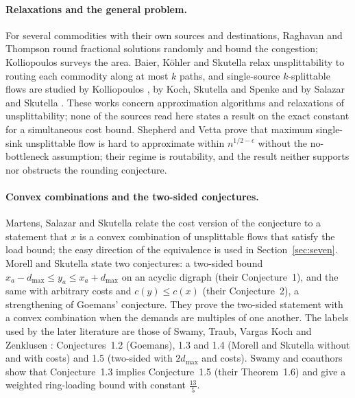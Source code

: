 \documentclass[11pt]{article}
\theoremstyle{remark}
\newcommand{\dmax}{d_{\max}}
\begin{document}
\paragraph{Relaxations and the general problem.} For several commodities with their own sources and
destinations, Raghavan and Thompson \cite{RT87,Rag88} round fractional solutions randomly and bound the
congestion; Kolliopoulos \cite{Kol07} surveys the area. Baier, K\"ohler and Skutella \cite{BKS05} relax
unsplittability to routing each commodity along at most $k$ paths, and single-source $k$-splittable flows are
studied by Kolliopoulos \cite{Kol05}, by Koch, Skutella and Spenke \cite{KSS08} and by Salazar and Skutella
\cite{SS09}. These works concern approximation algorithms and relaxations of unsplittability; none of the sources read here
states a result on the exact constant for a simultaneous cost bound. Shepherd and Vetta
\cite{SV15} prove that maximum single-sink unsplittable flow is hard to approximate within $n^{1/2-\epsilon}$
without the no-bottleneck assumption; their regime is routability, and the result neither supports nor
obstructs the rounding conjecture.

\paragraph{Convex combinations and the two-sided conjectures.} Martens, Salazar and Skutella \cite{MSS07} relate
the cost version of the conjecture to a statement that $x$ is a convex combination of unsplittable flows that
satisfy the load bound; the easy direction of the equivalence is used in Section~\ref{sec:seven}. Morell and
Skutella \cite{MS22} state two conjectures: a two-sided bound $x_a-\dmax\le y_a\le x_a+\dmax$ on an acyclic
digraph (their Conjecture~1), and the same with arbitrary costs and $c(y)\le c(x)$ (their Conjecture~2), a
strengthening of Goemans' conjecture. They prove the two-sided statement with a convex combination when the demands
are multiples of one another. The labels used by the later literature are those of Swamy, Traub, Vargas Koch and
Zenklusen \cite{STVZ25}: Conjectures~1.2 (Goemans), 1.3 and 1.4 (Morell and Skutella without and with costs) and 1.5
(two-sided with $2\dmax$ and costs). Swamy and coauthors show that Conjecture~1.3 implies Conjecture~1.5
(their Theorem~1.6) and give a weighted ring-loading bound with constant $\tfrac{13}{5}$.
\end{document}
